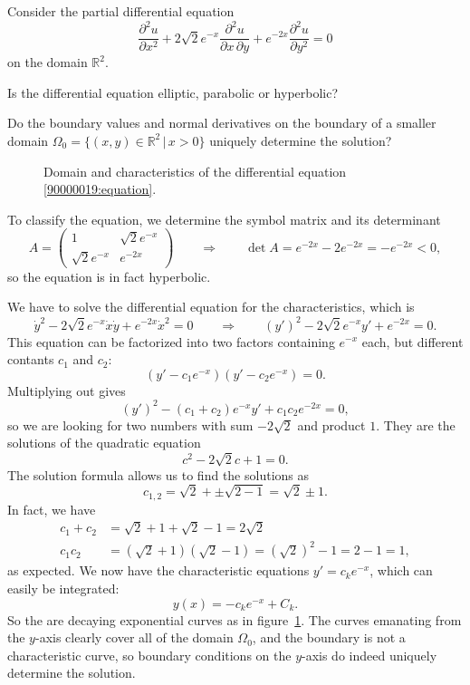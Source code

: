 Consider the partial differential equation
\begin{equation}
\frac{\partial^2 u}{\partial x^2}
+
2\sqrt{2}e^{-x}\frac{\partial^2 u}{\partial x\,\partial y}
+
e^{-2x}
\frac{\partial^2 u}{\partial y^2}
=
0
\label{90000019:equation}
\end{equation}
on the domain $\mathbb R^2$.
\begin{teilaufgaben}
\item
Is the differential equation elliptic, parabolic or hyperbolic?
\item
Do the boundary values and normal derivatives  on the boundary of a
smaller domain $\Omega_0 = \{(x,y)\in\mathbb R^2\,|\, x > 0\}$
uniquely determine the solution?
\end{teilaufgaben}

\begin{loesung}
\begin{figure}
\centering
{}
\caption{Domain and characteristics of the differential equation
\eqref{90000019:equation}.
\label{90000019:figure}}
\end{figure}
\begin{teilaufgaben}
\item
To classify the equation, we determine the symbol matrix and its
determinant
\[
A=\begin{pmatrix}
1&\sqrt{2}e^{-x}\\
\sqrt{2}e^{-x}&e^{-2x}
\end{pmatrix}
\qquad\Rightarrow\qquad
\det A
=
e^{-2x} - 2e^{-2x}=-e^{-2x} < 0,
\]
so the equation is in fact hyperbolic.
\item
We have to solve the differential equation for the characteristics, which is
\[
\dot{y}^2 -2\sqrt{2}e^{-x} \dot{x}\dot{y} + e^{-2x} \dot{x}^2 = 0
\qquad\Rightarrow\qquad
(y')^2 - 2\sqrt{2}e^{-x}y' + e^{-2x}=0.
\]
This equation can be factorized into two factors containing $e^{-x}$
each, but different contants $c_1$ and $c_2$:
\[
(y'  - c_1e^{-x})(y' - c_2e^{-x}) = 0.
\]
Multiplying out gives
\[
(y')^2 -(c_1+c_2) e^{-x} y' + c_1c_2e^{-2x} = 0,
\]
so we are looking for two numbers with sum $-2\sqrt{2}$ and product $1$.
They are the solutions of the quadratic equation
\[
c^2 -2\sqrt{2}c + 1=0.
\]
The solution formula allows us to find the solutions as
\[
c_{1,2} = \sqrt{2}+\pm\sqrt{2-1}=\sqrt{2}\pm 1.
\]
In fact, we have
\begin{align*}
c_1+c_2 &= \!\sqrt{2}+1+\!\sqrt{2}-1=2\!\sqrt{2}\\
c_1c_2 &= (\!\sqrt{2}+1)(\!\sqrt{2}-1)=(\!\sqrt{2})^2-1=2-1=1,
\end{align*}
as expected.
We now have the characteristic equations $y'=c_ke^{-x}$, which can easily
be integrated:
\[
y(x) = -c_ke^{-x} + C_k.
\]
So the are decaying exponential curves as in figure~\ref{90000019:figure}.
The curves emanating from the $y$-axis clearly cover all of the domain
$\Omega_0$, and the boundary is not a characteristic curve, so boundary
conditions on the $y$-axis do indeed uniquely determine the solution.
\qedhere
\end{teilaufgaben}
\end{loesung}

